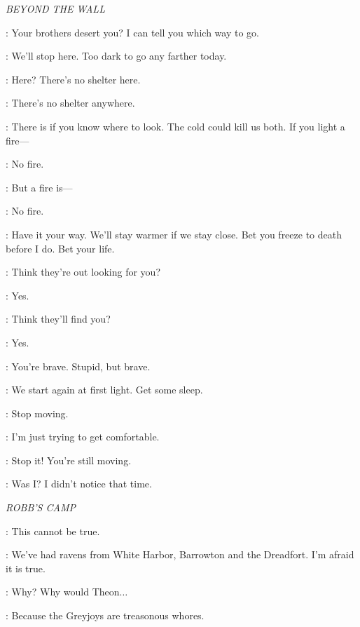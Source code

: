 \scene

\textit{BEYOND THE WALL} 


\YGRITTE: Your brothers desert you? I can tell you which way to go. 

\JON: We'll stop here. Too dark to go any farther today. 

\YGRITTE: Here? There's no shelter here. 

\JON: There's no shelter anywhere. 

\YGRITTE: There is if you know where to look.  The cold could kill us both. If you light a fire--- 

\JON: No fire. 

\YGRITTE: But a fire is--- 

\JON: No fire. 

\YGRITTE: Have it your way.  We'll stay warmer if we stay close. Bet you freeze to death before I do. Bet your life.


\YGRITTE: Think they're out looking for you? 

\JON: Yes. 

\YGRITTE: Think they'll find you? 

\JON: Yes. 

\YGRITTE: You're brave. Stupid, but brave. 

\JON: We start again at first light. Get some sleep.


\JON: Stop moving. 

\YGRITTE: I'm just trying to get comfortable. 

\JON: Stop it! You're still moving. 

\YGRITTE: Was I? I didn't notice that time. 


\scene

\textit{ROBB'S CAMP} 


\ROBB: This cannot be true. 

\ROOSE: We've had ravens from White Harbor, Barrowton and the Dreadfort. I'm afraid it is true. 

\ROBB: Why? Why would Theon$\ldots$ 

\ROOSE: Because the Greyjoys are treasonous whores. 

